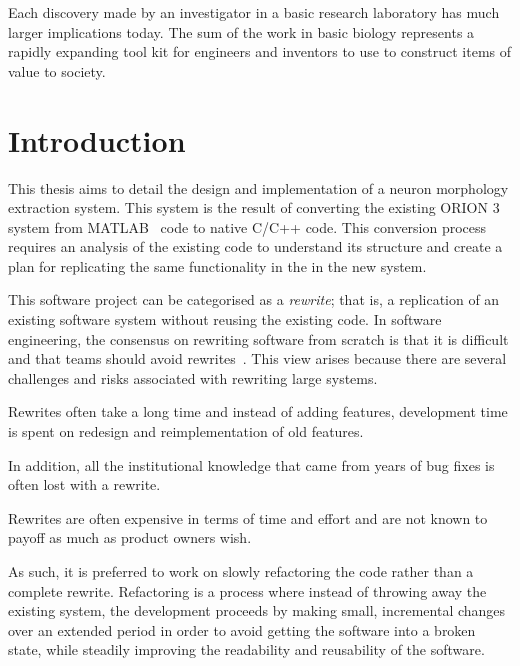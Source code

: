 \begin{savequote}[0.55\linewidth]
	\begin{fancyquote}
		Each discovery made by an investigator in a basic research
		laboratory has much larger implications today. The sum of the work in basic
		biology represents a rapidly expanding tool kit for engineers and inventors to
		use to construct items of value to society.
	\end{fancyquote}
\end{savequote}
\chapter{Introduction}\label{ch:introduction}

This thesis aims to detail the design and implementation of a
neuron morphology extraction system. This system is the result of
converting the existing ORION 3~\citep{ORION_Santamaria-Pang2015} system from
MATLAB~\citep{MATLAB:2013a} code to native C/C++ code.
This conversion process requires an analysis of the existing code
to understand its structure and create a plan for replicating the
same functionality in the in the new system.

This software project can be categorised as a \emph{rewrite}; that
is, a replication of an existing software system without
reusing the existing code. In software engineering, the consensus
on rewriting software from scratch is that it is difficult and
that teams should avoid rewrites~\citep{JoelRewrite}. This view
arises because there are several challenges and risks associated
with rewriting large systems.
\begin{inparablank}
\item Rewrites often take a long time and instead of adding
	features, development time is spent on redesign and
	reimplementation of old features.
\item In addition, all the institutional knowledge that came from
	years of bug fixes is often lost with a rewrite.
\item Rewrites are often expensive in terms of time and effort and
	are not known to payoff as much as product owners wish.
\end{inparablank}
As such, it is preferred to work on slowly refactoring the code
rather than a complete rewrite.  Refactoring is a process where
instead of throwing away the existing system, the development
proceeds by making small, incremental changes over an extended
period in order to avoid getting the software into a broken state,
while steadily improving the readability and reusability of the
software.

